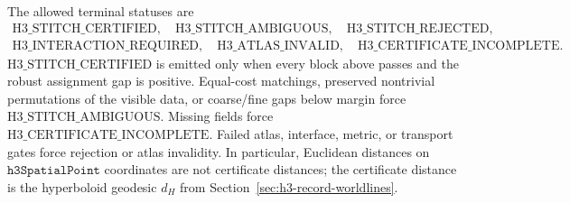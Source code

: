 The allowed terminal statuses are
\[
\begin{gathered}
\mathrm{H3\_STITCH\_CERTIFIED},\quad
\mathrm{H3\_STITCH\_AMBIGUOUS},\quad
\mathrm{H3\_STITCH\_REJECTED},\\
\mathrm{H3\_INTERACTION\_REQUIRED},\quad
\mathrm{H3\_ATLAS\_INVALID},\quad
\mathrm{H3\_CERTIFICATE\_INCOMPLETE}.
\end{gathered}
\]
\(\mathrm{H3\_STITCH\_CERTIFIED}\) is emitted only when every block above passes and the robust
assignment gap is positive. Equal-cost matchings, preserved nontrivial permutations of the visible
data, or coarse/fine gaps below margin force \(\mathrm{H3\_STITCH\_AMBIGUOUS}\). Missing fields
force \(\mathrm{H3\_CERTIFICATE\_INCOMPLETE}\). Failed atlas, interface, metric, or transport gates
force rejection or atlas invalidity. In particular, Euclidean distances on
\(\texttt{h3SpatialPoint}\) coordinates are not certificate distances; the certificate distance is
the hyperboloid geodesic \(d_H\) from Section~\ref{sec:h3-record-worldlines}.
